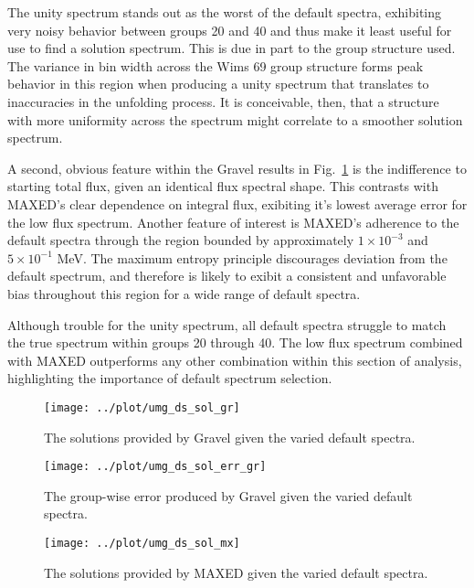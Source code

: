 \documentclass[journal]{IEEEtran}
\newcommand{\FIG}[1]{Fig.~\ref{#1}}               %
\begin{document}
The unity spectrum stands out as the worst of the default spectra, exhibiting very noisy behavior between groups 20 and 40 and thus make it least useful for use to find a solution spectrum.
This is due in part to the group structure used.
The variance in bin width across the Wims 69 group structure forms peak behavior in this region when producing a unity spectrum that translates to inaccuracies in the unfolding process.
It is conceivable, then, that a structure with more uniformity across the spectrum might correlate to a smoother solution spectrum.

A second, obvious feature within the Gravel results in \FIG{fig:ds_sol_gr} is the indifference to starting total flux, given an identical flux spectral shape.
This contrasts with MAXED's clear dependence on integral flux, exibiting it's lowest average error for the low flux spectrum.
Another feature of interest is MAXED's adherence to the default spectra through the region bounded by approximately $1 \times 10^{-3}$ and $5 \times 10^{-1}$ MeV.
The maximum entropy principle discourages deviation from the default spectrum, and therefore is likely to exibit a consistent and unfavorable bias throughout this region for a wide range of default spectra.

Although trouble for the unity spectrum, all default spectra struggle to match the true spectrum within groups 20 through 40.
The low flux spectrum combined with MAXED outperforms any other combination within this section of analysis, highlighting the importance of default spectrum selection.


\begin{figure}[h!tb]
  \centering
  \texttt{[image: ../plot/umg\_ds\_sol\_gr]}
  \caption{The solutions provided by Gravel given the varied default spectra.}
  \label{fig:ds_sol_gr}
\end{figure}

\begin{figure}[h!tb]
  \centering
  \texttt{[image: ../plot/umg\_ds\_sol\_err\_gr]}
  \caption{The group-wise error produced by Gravel given the varied default spectra.}
  \label{fig:ds_err_gr}
\end{figure}

\begin{figure}[h!tb]
  \centering
  \texttt{[image: ../plot/umg\_ds\_sol\_mx]}
  \caption{The solutions provided by MAXED given the varied default spectra.}
  \label{fig:ds_sol_mx}
\end{figure}
\end{document}

